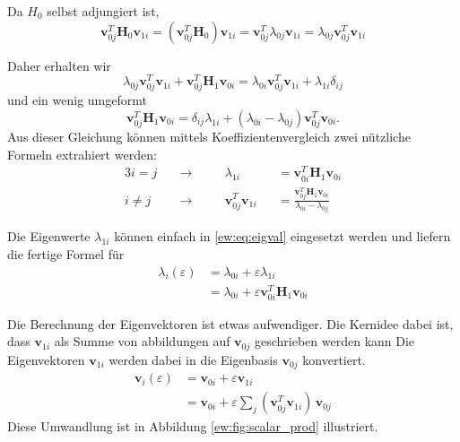 Da $H_0$ selbst adjungiert ist,
\begin{equation}
    \bm v_{0j}^T \bm H_0 \bm v_{1i}
    =
    \left( \bm v_{0j}^T \bm H_0 \right) \bm v_{1i}
    =
    \bm v_{0j}^T \lambda_{0j} \bm v_{1i}
    =
    \lambda_{0j} \bm v_{0j}^T \bm v_{1i}
\end{equation}

Daher erhalten wir
\begin{equation}
    \lambda_{0j} \bm v_{0j}^T \bm v_{1i} + 
    \bm v_{0j}^T \bm H_1 \bm v_{0i}
    =
    \lambda_{0i} \bm v_{0j}^T \bm v_{1i} +
    \lambda_{1i} \delta_{ij}
\end{equation}
und ein wenig umgeformt
\begin{equation}
    \bm v_{0j}^T \bm H_1 \bm v_{0i}
    =
    \delta_{ij} \lambda_{1i} + 
    ( \lambda_{0i} - \lambda_{0j} )
    \bm v_{0j}^T  \bm v_{0i} .
\end{equation} \label{ew:eq:f}
Aus dieser Gleichung können mittels Koeffizientenvergleich zwei nützliche Formeln extrahiert werden:
\begin{alignat}{3}
    i = j \quad & \rightarrow  \quad && \lambda_{1i}&& = \bm v_{0i}^T \bm H_1 \bm v_{0i} \\
    i \neq j \quad & \rightarrow \quad && \bm v_{0j}^T \bm v_{1i}&& = \frac{\bm v_{0j}^T \bm H_1 \bm v_{0i}}{\lambda_{0i} - \lambda_{0j}} 
\end{alignat} \label{ew:eq:f2}

Die Eigenwerte $\lambda_{1i}$ können einfach in \ref{ew:eq:eigval} eingesetzt werden und liefern die fertige Formel für   
\begin{align*}
    \lambda_i(\varepsilon)
    &=
    \lambda_{0i} + \varepsilon \lambda_{1i} \\
    &=
    \lambda_{0i} + \varepsilon \bm v_{0i}^T \bm H_1 \bm v_{0i}
\end{align*}

Die Berechnung der Eigenvektoren ist etwas aufwendiger.
Die Kernidee dabei ist, dass $\bm v_{1i}$ als Summe von abbildungen auf $\bm v_{0j}$ geschrieben werden kann
Die Eigenvektoren $\bm v_{1i}$ werden dabei in die Eigenbasis $\bm v_{0j}$ konvertiert. %
\begin{align*}
    \bm v_i(\varepsilon)
    &=
    \bm v_{0i} + \varepsilon \bm v_{1i} \\
    &=
    \bm v_{0i} + \varepsilon \sum_{j} ( \bm v_{0j}^T \bm v_{1i}) \, \bm v_{0j}
\end{align*}
Diese Umwandlung ist in Abbildung \ref{ew:fig:scalar_prod} illustriert.

